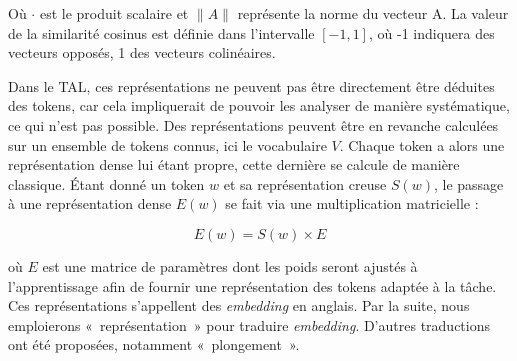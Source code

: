 \documentclass[citation\_needed]{subfiles}
\begin{document}
Où $\cdot$ est le produit scalaire et $\|A\|$ représente la norme du vecteur A. La valeur de la similarité cosinus est définie dans l'intervalle $[-1,1]$, où -1 indiquera des vecteurs opposés, 1 des vecteurs colinéaires.


Dans le TAL, ces représentations ne peuvent pas être directement être déduites des tokens, car cela impliquerait de pouvoir les analyser de manière systématique, ce qui n'est pas possible. Des représentations peuvent être en revanche calculées sur un ensemble de tokens connus, ici le vocabulaire $V$. Chaque token a alors une représentation dense lui étant propre, cette dernière se calcule de manière classique. Étant donné un token $w$ et sa représentation creuse $S(w)$, le passage à une représentation dense $E(w)$ se fait via une multiplication matricielle :

\begin{equation}\label{eq:sparse-to-dense}
E(w) = S(w) \times E
\end{equation}

où $E$ est une matrice de paramètres dont les poids seront ajustés à l'apprentissage afin de fournir une représentation des tokens adaptée à la tâche. Ces représentations s'appellent des \textit{embedding} en anglais. Par la suite, nous emploierons «\ représentation\ » pour traduire \textit{embedding}. D'autres traductions ont été proposées, notamment «\ plongement\ ».
\end{document}
